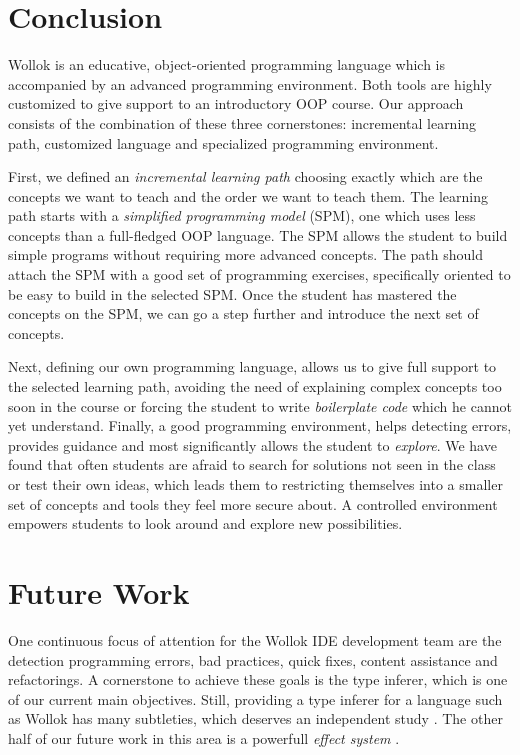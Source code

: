 \section{Conclusion}
\label{sec:conclusion}


Wollok is an educative, object-oriented programming language which is accompanied by an advanced programming environment.
Both tools are highly customized to give support to an introductory OOP course.
Our approach consists of the combination of these three cornerstones: incremental learning path, customized language and specialized programming environment.

First, we defined an \emph{incremental learning path} choosing exactly which are the concepts we want to teach and the order we want to teach them.
The learning path starts with a \emph{simplified programming model} (SPM), \ie one which uses less concepts than a full-fledged OOP language.
The SPM allows the student to build simple programs without requiring more advanced concepts.
The path should attach the SPM with a good set of programming exercises, specifically oriented to be easy to build in the selected SPM.
Once the student has mastered the concepts on the SPM, we can go a step further and introduce the next set of concepts.

Next, defining our own programming language, allows us to give full support to the selected learning path, 
avoiding the need of explaining complex concepts too soon in the course or forcing the student to write \emph{boilerplate code} which he cannot yet understand.
Finally, a good programming environment, helps detecting errors, provides guidance and most significantly allows the student to \emph{explore}.
We have found that often students are afraid to search for solutions not seen in the class or test their own ideas, 
which leads them to restricting themselves into a smaller set of concepts and tools they feel more secure about.
A controlled environment empowers students to look around and explore new possibilities.

\section{Future Work}
\label{sec:furtherWork}
One continuous focus of attention for the Wollok IDE development team are the detection programming errors, bad practices, quick fixes, content assistance and refactorings.
A cornerstone to achieve these goals is the type inferer, which is one of our current main objectives.
Still, providing a type inferer for a language such as Wollok has many subtleties, which deserves an independent study \cite{passerini_nicolas_extensible_2014}.
The other half of our future work in this area is a powerfull \emph{effect system} \cite{nielson_type_1999}.

